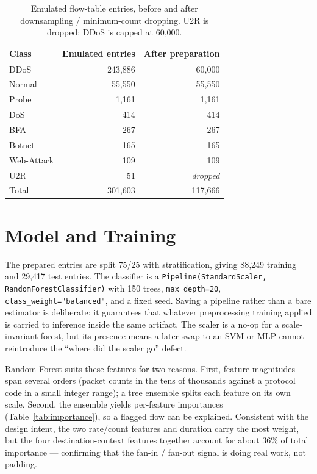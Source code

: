 \documentclass[11pt]{article}
\begin{document}
\begin{table}[h]
\centering
\caption{Emulated flow-table entries, before and after downsampling / minimum-count
dropping. U2R is dropped; DDoS is capped at 60{,}000.}
\label{tab:entrycounts}
\begin{tabular}{lrr}
\toprule
Class & Emulated entries & After preparation \\
\midrule
DDoS & 243{,}886 & 60{,}000 \\
Normal & 55{,}550 & 55{,}550 \\
Probe & 1{,}161 & 1{,}161 \\
DoS & 414 & 414 \\
BFA & 267 & 267 \\
Botnet & 165 & 165 \\
Web-Attack & 109 & 109 \\
U2R & 51 & \emph{dropped} \\
\midrule
Total & 301{,}603 & 117{,}666 \\
\bottomrule
\end{tabular}
\end{table}

\section{Model and Training}
The prepared entries are split 75/25 with stratification, giving 88,249 training and
29,417 test entries. The classifier is a \texttt{Pipeline(StandardScaler,
RandomForestClassifier)} with 150 trees, \texttt{max\_depth=20},
\texttt{class\_weight="balanced"}, and a fixed seed. Saving a pipeline rather than a bare
estimator is deliberate: it guarantees that whatever preprocessing training applied is
carried to inference inside the same artifact. The scaler is a no-op for a scale-invariant
forest, but its presence means a later swap to an SVM or MLP cannot reintroduce the
``where did the scaler go'' defect.

Random Forest suits these features for two reasons. First, feature magnitudes span several
orders (packet counts in the tens of thousands against a protocol code in a small integer
range); a tree ensemble splits each feature on its own scale. Second, the ensemble yields
per-feature importances (Table~\ref{tab:importance}), so a flagged flow can be explained.
Consistent with the design intent, the two rate/count features and duration carry the most
weight, but the four destination-context features together account for about 36\% of total
importance --- confirming that the fan-in / fan-out signal is doing real work, not padding.
\end{document}
